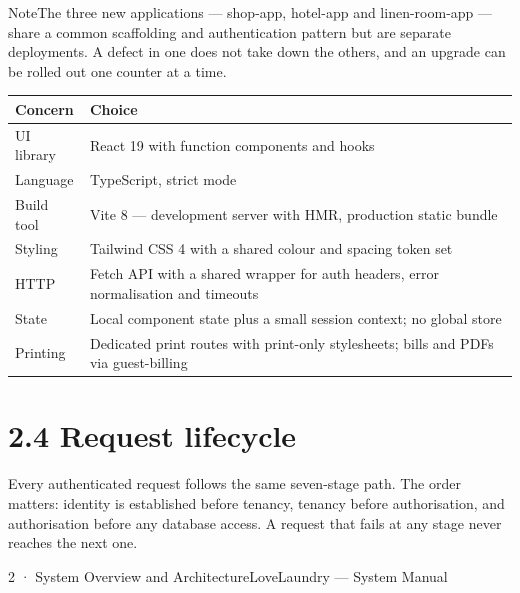 \documentclass[11pt,a4paper,oneside]{book}
\begin{document}
\begin{notebox}NoteThe three new applications — shop-app, hotel-app and linen-room-app — share a common scaffolding and authentication pattern but are separate deployments. A defect in one does not take down the others, and an upgrade can be rolled out one counter at a time.\end{notebox}
\begin{center}\small
\begin{tabularx}{\linewidth}{|X|X|}
\hline
\rowcolor{lightgrey}
\textbf{Concern} & \textbf{Choice} \\ \hline
UI library & React 19 with function components and hooks \\ \hline
Language & TypeScript, strict mode \\ \hline
Build tool & Vite 8 — development server with HMR, production static bundle \\ \hline
Styling & Tailwind CSS 4 with a shared colour and spacing token set \\ \hline
HTTP & Fetch API with a shared wrapper for auth headers, error normalisation and timeouts \\ \hline
State & Local component state plus a small session context; no global store \\ \hline
Printing & Dedicated print routes with print-only stylesheets; bills and PDFs via guest-billing \\ \hline
\end{tabularx}
\end{center}
\section{2.4 Request lifecycle}
Every authenticated request follows the same seven-stage path. The order matters: identity is established before tenancy, tenancy before authorisation, and authorisation before any database access. A request that fails at any stage never reaches the next one.

2 · System Overview and ArchitectureLoveLaundry — System Manual
\end{document}
